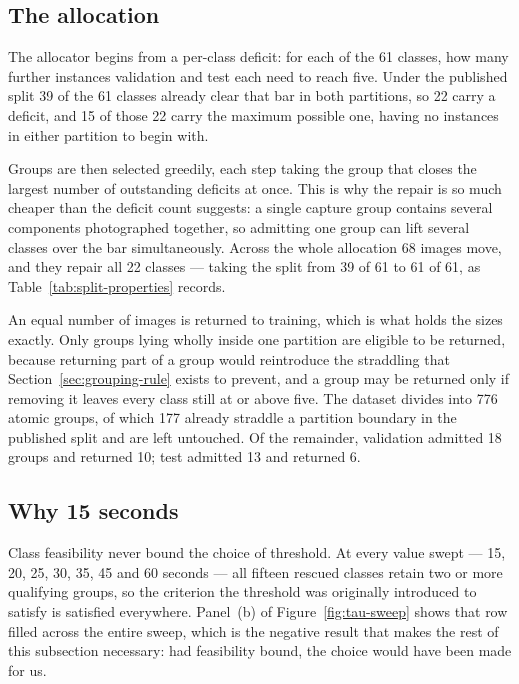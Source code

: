 \subsection{The allocation}
\label{sec:allocation}

The allocator begins from a per-class deficit: for each of the 61 classes, how
many further instances validation and test each need to reach five. Under the
published split 39 of the 61 classes already clear that bar in both partitions,
so 22 carry a deficit, and 15 of those 22 carry the maximum possible one, having
no instances in either partition to begin with.

Groups are then selected greedily, each step taking the group that closes the
largest number of outstanding deficits at once. This is why the repair is so
much cheaper than the deficit count suggests: a single capture group contains
several components photographed together, so admitting one group can lift
several classes over the bar simultaneously. Across the whole allocation 68
images move, and they repair all 22 classes --- taking the split from 39 of 61
to 61 of 61, as Table~\ref{tab:split-properties} records.

An equal number of images is returned to training, which is what holds the sizes
exactly. Only groups lying wholly inside one partition are eligible to be
returned, because returning part of a group would reintroduce the straddling
that Section~\ref{sec:grouping-rule} exists to prevent, and a group may be
returned only if removing it leaves every class still at or above five. The
dataset divides into 776 atomic groups, of which 177 already straddle a
partition boundary in the published split and are left untouched. Of the
remainder, validation admitted 18 groups and returned 10; test admitted 13 and
returned 6.

\subsection{Why 15 seconds}
\label{sec:tau-choice}

Class feasibility never bound the choice of threshold. At every value swept ---
15, 20, 25, 30, 35, 45 and 60 seconds --- all fifteen rescued classes retain two
or more qualifying groups, so the criterion the threshold was originally
introduced to satisfy is satisfied everywhere. Panel~(b) of
Figure~\ref{fig:tau-sweep} shows that row filled across the entire sweep, which
is the negative result that makes the rest of this subsection necessary: had
feasibility bound, the choice would have been made for us.

